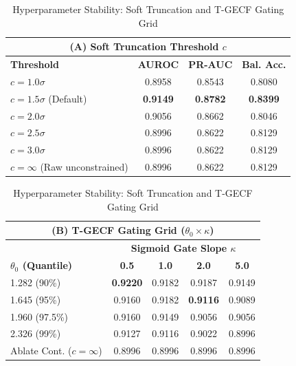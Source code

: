 \begin{table}[t]
\centering
\caption{Hyperparameter Stability: Soft Truncation and T-GECF Gating Grid}
\label{tab:hyperparam_stability}
\vspace{-4pt}
\footnotesize
\renewcommand{\arraystretch}{0.84}
\setlength{\tabcolsep}{1.8pt}
\begin{tabular*}{\columnwidth}{@{\extracolsep{\fill}}lccc}
\hline
\multicolumn{4}{c}{\textbf{(A) Soft Truncation Threshold $c$}} \\
\hline
\textbf{Threshold} & \textbf{AUROC} & \textbf{PR-AUC} & \textbf{Bal. Acc.} \\
\hline
$c = 1.0\sigma$ & 0.8958 & 0.8543 & 0.8080 \\
$c = 1.5\sigma$ (Default) & \textbf{0.9149} & \textbf{0.8782} & \textbf{0.8399} \\
$c = 2.0\sigma$ & 0.9056 & 0.8662 & 0.8046 \\
$c = 2.5\sigma$ & 0.8996 & 0.8622 & 0.8129 \\
$c = 3.0\sigma$ & 0.8996 & 0.8622 & 0.8129 \\
$c = \infty$ (Raw unconstrained) & 0.8996 & 0.8622 & 0.8129 \\
\hline
\end{tabular*}
\vspace{3pt}
\noindent\begin{tabular*}{\columnwidth}{@{\extracolsep{\fill}}lcccc}
\hline
\multicolumn{5}{c}{\textbf{(B) T-GECF Gating Grid ($\theta_0 \times \kappa$)}} \\
\hline
 & \multicolumn{4}{c}{\textbf{Sigmoid Gate Slope $\kappa$}} \\
\textbf{$\theta_0$ (Quantile)} & \textbf{0.5} & \textbf{1.0} & \textbf{2.0} & \textbf{5.0} \\
\hline
1.282 (90\%) & \textbf{0.9220} & 0.9182 & 0.9187 & 0.9149 \\
1.645 (95\%) & 0.9160 & 0.9182 & \textbf{0.9116} & 0.9089 \\
1.960 (97.5\%) & 0.9160 & 0.9149 & 0.9056 & 0.9056 \\
2.326 (99\%) & 0.9127 & 0.9116 & 0.9022 & 0.8996 \\
Ablate Cont. ($c=\infty$) & 0.8996 & 0.8996 & 0.8996 & 0.8996 \\
\hline
\end{tabular*}
\vspace{-4pt}
\end{table}

